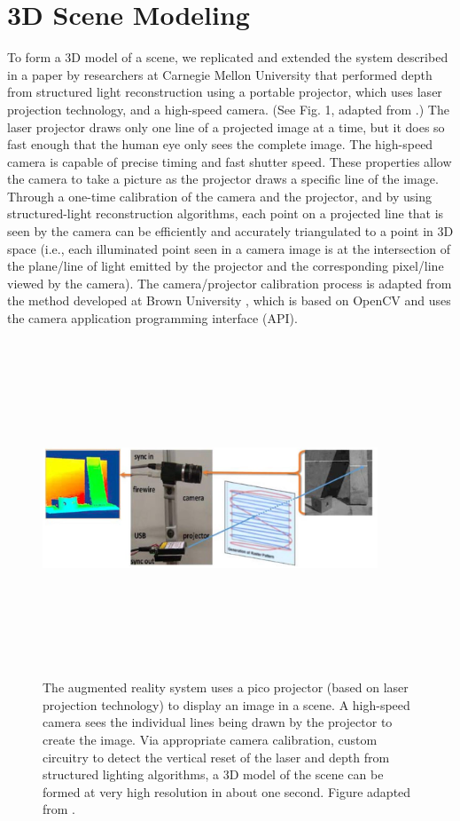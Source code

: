 \documentclass{llncs}
\begin{document}
\section{3D Scene Modeling}
To form a 3D model of a scene, we replicated and extended the system described in a paper by researchers at Carnegie Mellon University that performed depth from structured light reconstruction using a portable projector, which uses laser projection technology, and a high-speed camera. (See Fig. 1, adapted from \cite{mertz2012low}.) The laser projector draws only one line of a projected image at a time, but it does so fast enough that the human eye only sees the complete image.
The high-speed camera is capable of precise timing and fast shutter speed. These properties allow the camera to take a picture as the projector draws a specific line of the image. Through a one-time calibration of the camera and the projector, and by using structured-light reconstruction algorithms, each point on a projected line that is seen by the camera can be efficiently and accurately triangulated to a point in 3D space (i.e., each illuminated point seen in a camera image is at the intersection of the plane/line of light emitted by the projector and the corresponding pixel/line viewed by the camera). The camera/projector calibration process is adapted from the method developed at Brown University \cite{moreno2012simple}, which is based on OpenCV and uses the camera application programming interface (API).
\begin{figure}
\centering
\includegraphics[width=10cm,height=10cm,keepaspectratio]{plan}
\caption{
The augmented reality system uses a pico projector (based on laser projection technology) to display an image in a scene. A high-speed camera sees the individual lines being drawn by the projector to create the image. Via appropriate camera calibration, custom circuitry to detect the vertical reset of the laser and depth from structured lighting algorithms, a 3D model of the scene can be formed at very high resolution in about one second. Figure adapted from \cite{mertz2012low}.
}
\end{figure}
\end{document}
